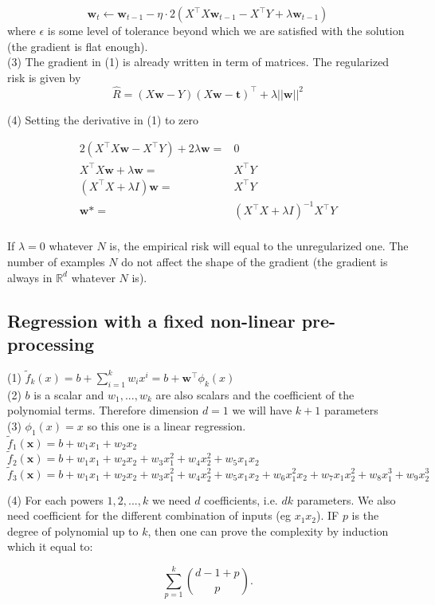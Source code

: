 \documentclass[11pt,english]{article}
\newcommand{\real}{\mathbb{R}}
\begin{document}
       $$ \bm{w}_t \leftarrow \bm{w}_{t-1} - \eta \cdot 2(X^\top X\bm{w}_{t-1} - X^\top Y + \lambda \bm{w}_{t-1})
    $$
    where $\epsilon$ is some level of tolerance beyond which we are satisfied with the solution (the gradient is flat enough).\\

    (3) The gradient in (1) is already written in term of matrices. The regularized risk is given by
    $$
        \hat{R} = (X\bm{w}-Y)(X\bm{w}-\bm{t})^\top + \lambda ||\bm{w}||^2
    $$
    
    (4) Setting the derivative in (1) to zero
        
    \begin{equation}
        \begin{split}
            2(X^\top X\bm{w} - X^\top Y) + 2 \lambda \bm{w} =& 0 \\
            X^\top X\bm{w} + \lambda \bm{w} =& X^\top Y \\
            (X^\top X+ \lambda I) \bm{w} =& X^\top Y \\
             \bm{w}* =& (X^\top X+ \lambda I)^{-1}X^\top Y \\
        \end{split}
    \end{equation}

    If $\lambda=0$ whatever $N$ is, the empirical risk will equal to the unregularized one. The number of examples $N$ do not affect the shape of the gradient (the gradient is always in $\real^d$ whatever $N$ is).

    \subsection{Regression with a fixed non-linear pre-processing}

    (1) $\tilde{f}_k (x)=b + \sum_{i=1}^k w_i x^i = b + \bm{w}^\top \phi_k(x)$\\

    (2) $b$ is a scalar and $w_1,...,w_k$ are also scalars and the coefficient of the polynomial terms. Therefore dimension $d=1$ we will have $k+1$ parameters\\
    
    (3) $\phi_1(x)=x$ so this one is a linear regression. \\

    $\tilde{f}_1 (\bm{x})=b + w_1 x_1 + w_2 x_2$\\

    $\tilde{f}_2 (\bm{x})=b + w_1 x_1 + w_2 x_2 + w_3 x_1^2 + w_4 x_2^2 + w_5 x_1 x_2$\\

    $\tilde{f}_3 (\bm{x})=b + w_1 x_1 + w_2 x_2 + w_3 x_1^2 + w_4 x_2^2 + w_5 x_1 x_2 + w_6 x_1^2x_2 + w_7 x_1x_2^2 + w_8x_1^3 + w_9x_2^3$

    (4) For each powers $1,2,...,k$ we need $d$ coefficients, i.e. $dk$ parameters. We also need coefficient for the different combination of inputs (eg $x_1x_2$). IF $p$ is the degree of polynomial up to $k$, then one can prove the complexity by induction which it equal to:
    
    $$\sum_{p=1}^{k} \binom{d-1+p}{p}.$$
\end{document}
